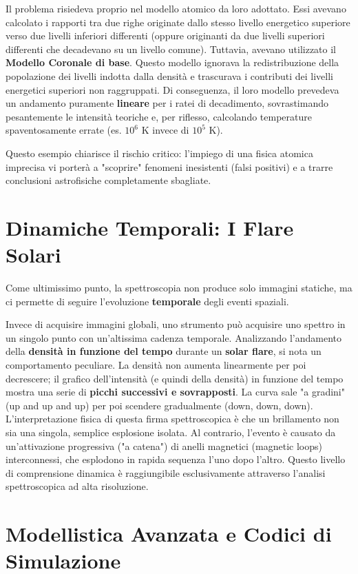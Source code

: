 Il problema risiedeva proprio nel modello atomico da loro adottato. Essi avevano calcolato i rapporti tra due righe originate dallo stesso livello energetico superiore verso due livelli inferiori differenti (oppure originanti da due livelli superiori differenti che decadevano su un livello comune). Tuttavia, avevano utilizzato il \textbf{Modello Coronale di base}. Questo modello ignorava la redistribuzione della popolazione dei livelli indotta dalla densità e trascurava i contributi dei livelli energetici superiori non raggruppati. Di conseguenza, il loro modello prevedeva un andamento puramente \textbf{lineare} per i ratei di decadimento, sovrastimando pesantemente le intensità teoriche e, per riflesso, calcolando temperature spaventosamente errate (es. $10^6\text{ K}$ invece di $10^5\text{ K}$).

Questo esempio chiarisce il rischio critico: l'impiego di una fisica atomica imprecisa vi porterà a "scoprire" fenomeni inesistenti (falsi positivi) e a trarre conclusioni astrofisiche completamente sbagliate.

\section{Dinamiche Temporali: I Flare Solari}

Come ultimissimo punto, la spettroscopia non produce solo immagini statiche, ma ci permette di seguire l'evoluzione \textbf{temporale} degli eventi spaziali.

Invece di acquisire immagini globali, uno strumento può acquisire uno spettro in un singolo punto con un'altissima cadenza temporale. Analizzando l'andamento della \textbf{densità in funzione del tempo} durante un \textbf{solar flare}, si nota un comportamento peculiare.
La densità non aumenta linearmente per poi decrescere; il grafico dell'intensità (e quindi della densità) in funzione del tempo mostra una serie di \textbf{picchi successivi e sovrapposti}. La curva sale "a gradini" (up and up and up) per poi scendere gradualmente (down, down, down).
L'interpretazione fisica di questa firma spettroscopica è che un brillamento non sia una singola, semplice esplosione isolata. Al contrario, l'evento è causato da un'attivazione progressiva ("a catena") di anelli magnetici (magnetic loops) interconnessi, che esplodono in rapida sequenza l'uno dopo l'altro.
Questo livello di comprensione dinamica è raggiungibile esclusivamente attraverso l'analisi spettroscopica ad alta risoluzione.

\section{Modellistica Avanzata e Codici di Simulazione}

